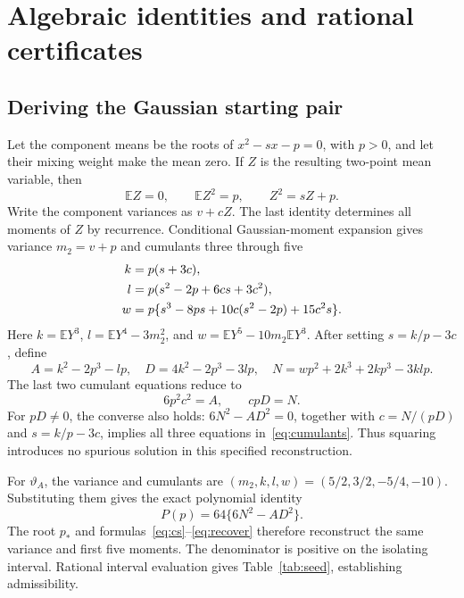 \documentclass[11pt,a4paper]{article}
\numberwithin{equation}{section}
\newcommand{\E}{\mathbb E}
\newcommand{\vt}{\vartheta}
\begin{document}
\appendix
\section{Algebraic identities and rational certificates}\label{app:algebra}
\subsection{Deriving the Gaussian starting pair}
Let the component means be the roots of $x^2-sx-p=0$, with $p>0$, and let their mixing weight make the mean zero. If $Z$ is the resulting two-point mean variable, then
\[
 \E Z=0,\qquad \E Z^2=p,\qquad Z^2=sZ+p.
\]
Write the component variances as $v+cZ$. The last identity determines all moments of $Z$ by recurrence. Conditional Gaussian-moment expansion gives variance $m_2=v+p$ and cumulants three through five
\begin{align}
 k&=p(s+3c),\notag\\
 l&=p(s^2-2p+6cs+3c^2),\label{eq:cumulants}\\
 w&=p\{s^3-8ps+10c(s^2-2p)+15c^2s\}.\notag
\end{align}
Here $k=\E Y^3$, $l=\E Y^4-3m_2^2$, and $w=\E Y^5-10m_2\E Y^3$. After setting $s=k/p-3c$, define
\[
 A=k^2-2p^3-lp,\quad D=4k^2-2p^3-3lp,\quad
 N=wp^2+2k^3+2kp^3-3klp.
\]
The last two cumulant equations reduce to
\begin{equation}\label{eq:eliminate}
 6p^2c^2=A,\qquad cpD=N.
\end{equation}
For $pD\ne0$, the converse also holds: $6N^2-AD^2=0$, together with $c=N/(pD)$ and $s=k/p-3c$, implies all three equations in~\eqref{eq:cumulants}. Thus squaring introduces no spurious solution in this specified reconstruction.

For $\vt_A$, the variance and cumulants are $(m_2,k,l,w)=(5/2,3/2,-5/4,-10)$. Substituting them gives the exact polynomial identity
\[
 P(p)=64\{6N^2-AD^2\}.
\]
The root $p_*$ and formulas~\eqref{eq:cs}--\eqref{eq:recover} therefore reconstruct the same variance and first five moments. The denominator is positive on the isolating interval. Rational interval evaluation gives Table~\ref{tab:seed}, establishing admissibility.
\end{document}

